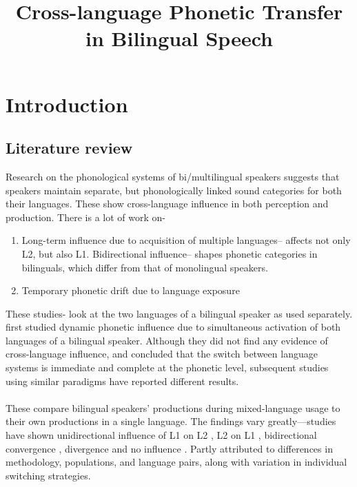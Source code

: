 \documentclass[11pt]{article}
\title{Cross-language Phonetic Transfer in Bilingual Speech}
\date{}
\begin{document}
\maketitle
	


\section{Introduction}
\subsection{Literature review}

Research on the phonological systems of bi/multilingual speakers suggests that speakers maintain separate, but phonologically linked sound categories for both their languages. These show cross-language influence in both perception and production. There is a lot of work on-
\begin{enumerate}[label=(\roman*)]
	
\item Long-term influence due to acquisition of multiple languages-- affects not only L2, but also L1. Bidirectional influence-- shapes phonetic categories in bilinguals, which differ from that of monolingual speakers\cite{caramazza1973acquisition, flege1987production, guion2003vowel}.

\item Temporary phonetic drift due to language exposure \cite{sancier1997gestural,chang2012rapid,tobin2017phonetic}
\end{enumerate}
These studies- look at the two languages of a bilingual speaker as used separately.
 first studied dynamic phonetic influence due to simultaneous activation of both languages of a bilingual speaker. Although they did not find any evidence of cross-language influence, and concluded that the switch between language systems is immediate and complete at the phonetic level, subsequent studies using similar paradigms have reported different results.

\paragraph{}These compare bilingual speakers’ productions during mixed-language usage to their own productions in a single language. The findings vary greatly—studies have shown unidirectional influence of L1 on L2 \cite{balukas2015spanish,antoniou2011inter,vsimavckova2015immediate,goldrick2014language}, L2 on L1 \cite{tsui2019impact,elias2017effects}, bidirectional convergence \cite{bullock2009trying, olson2016role}, divergence \cite{bullock2009trying,vsimavckova2018patterns} and no influence \cite{muldner2019phonetics,schwartz2015language}. Partly attributed to differences in methodology, populations, and language pairs, along with variation in individual switching strategies. 
\end{document}

